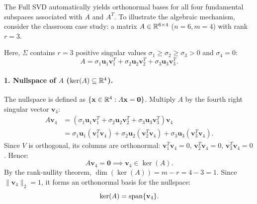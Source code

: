 The Full SVD automatically yields orthonormal bases for all four fundamental subspaces associated with $A$ and $A^T$.
To illustrate the algebraic mechanism, consider the classroom case study: a matrix $A \in \mathbb{R}^{6 \times 4}$ ($n = 6, m = 4$) with rank $r = 3$.

Here, $\Sigma$ contains $r = 3$ positive singular values $\sigma_1 \ge \sigma_2 \ge \sigma_3 > 0$ and $\sigma_4 = 0$:
\begin{equation}
    A = \sigma_1 \mathbf{u}_1 \mathbf{v}_1^T + \sigma_2 \mathbf{u}_2 \mathbf{v}_2^T + \sigma_3 \mathbf{u}_3 \mathbf{v}_3^T.
\end{equation}

\paragraph{1. Nullspace of $A$ ($\ker(A) \subseteq \mathbb{R}^4$).}
The nullspace is defined as $\{\mathbf{x} \in \mathbb{R}^4 : A\mathbf{x} = \mathbf{0}\}$. Multiply $A$ by the fourth right singular vector $\mathbf{v}_4$:
\begin{align}
    A \mathbf{v}_4 &= \left( \sigma_1 \mathbf{u}_1 \mathbf{v}_1^T + \sigma_2 \mathbf{u}_2 \mathbf{v}_2^T + \sigma_3 \mathbf{u}_3 \mathbf{v}_3^T \right) \mathbf{v}_4 \nonumber \\
                   &= \sigma_1 \mathbf{u}_1 (\mathbf{v}_1^T \mathbf{v}_4) + \sigma_2 \mathbf{u}_2 (\mathbf{v}_2^T \mathbf{v}_4) + \sigma_3 \mathbf{u}_3 (\mathbf{v}_3^T \mathbf{v}_4).
\end{align}
Since $V$ is orthogonal, its columns are orthonormal: $\mathbf{v}_1^T \mathbf{v}_4 = 0$, $\mathbf{v}_2^T \mathbf{v}_4 = 0$, $\mathbf{v}_3^T \mathbf{v}_4 = 0$. Hence:
\begin{equation}
    A \mathbf{v}_4 = \mathbf{0} \implies \mathbf{v}_4 \in \ker(A).
\end{equation}
By the rank-nullity theorem, $\dim(\ker(A)) = m - r = 4 - 3 = 1$. Since $\|\mathbf{v}_4\|_2 = 1$, it forms an orthonormal basis for the nullspace:
\begin{equation}
    \ker(A) = \operatorname{span}\{\mathbf{v}_4\}.
\end{equation}

